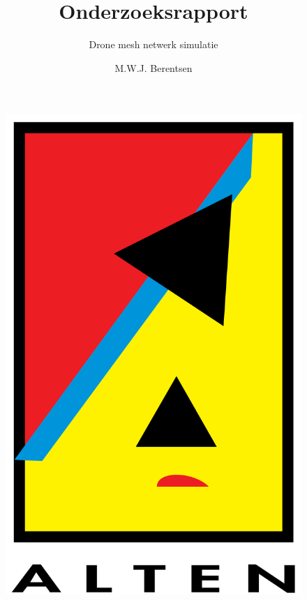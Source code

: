 \documentclass[a4paper, 11pt, oneside]{report}
\author{M.W.J. Berentsen}
\title{\myfont Onderzoeksrapport}
\subtitle{Drone mesh netwerk simulatie}{HAN Arnhem}{561399}{MWJ.Berentsen@student.han.nl}{Versie 1}{Alten Nederland B.V.}{Docent: J. Visch, MSc}{Assessor: ir. C.G.R. van Uffelen}
\begin{document}
\begin{figure}
\begin{center}\includegraphics[scale=0.1]{alten}\end{center}
\end{figure}
\maketitle

\end{document}
